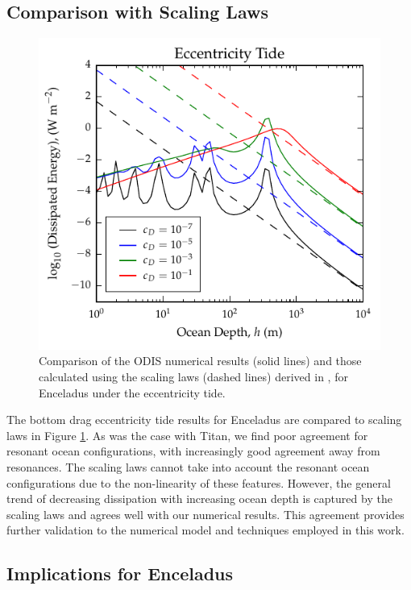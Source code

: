 \subsection{Comparison with Scaling Laws}

\begin{figure}[!b]
\centering
\includegraphics[width=0.85\linewidth]{Figures/enceladus_scaling}
\caption{Comparison of the ODIS numerical results (solid lines) and those calculated using the scaling laws (dashed lines) derived in \citet{chen2013tidal}, for Enceladus under the eccentricity tide. \label{fig:scalEncel}}
\end{figure}

The bottom drag eccentricity tide results for Enceladus are compared to \citet{chen2013tidal} scaling laws in Figure \ref{fig:scalEncel}. As was the case with Titan, we find poor agreement for resonant ocean configurations, with increasingly good agreement away from resonances. The scaling laws cannot take into account the resonant ocean configurations due to the non-linearity of these features. However, the general trend of decreasing dissipation with increasing ocean depth is captured by the scaling laws and agrees well with our numerical results. This agreement provides further validation to the numerical model and techniques employed in this work.

\subsection{Implications for Enceladus}

